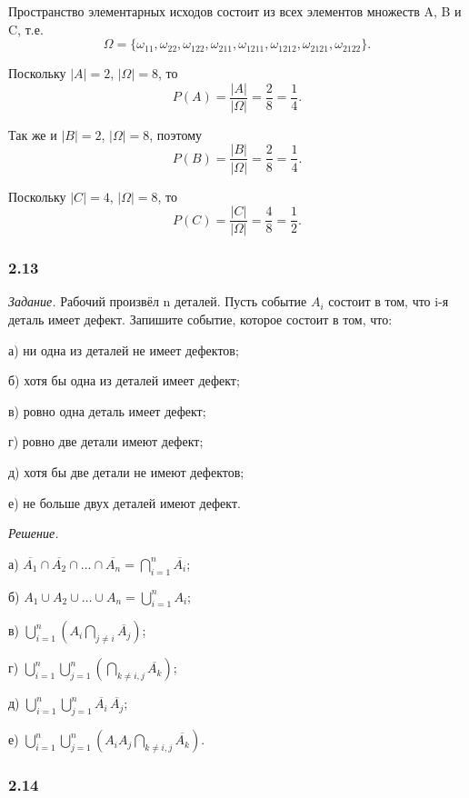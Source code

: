 \documentclass{book}
\begin{document}
Пространство элементарных исходов состоит из всех элементов множеств A, B и C, т.е.
$$ \Omega =
\{ \omega_{11}, \omega_{22}, \omega_{122}, \omega_{211}, \omega_{1211}, \omega_{1212}, \omega_{2121}, \omega_{2122} \}.$$

Поскольку $ |A| = 2 $, $ |\Omega| = 8 $, то
$$ P(A) =
\frac{ |A| }{ |\Omega| } =
\frac{2}{8} =
\frac{1}{4}.$$

Так же и $ |B| = 2 $, $ |\Omega| = 8 $, поэтому
$$ P(B) =
\frac{ |B| }{ |\Omega| } =
\frac{2}{8} =
\frac{1}{4}.$$

Поскольку $ |C| = 4 $, $ |\Omega| = 8 $, то
$$ P(C) =
\frac{ |C| }{ |\Omega| } =
\frac{4}{8} =
\frac{1}{2}.$$

\subsubsection*{2.13}

\textit{Задание.} Рабочий произвёл n деталей.
Пусть событие $ A_i $ состоит в том, что i-я деталь имеет дефект.
Запишите событие, которое состоит в том, что:

а) ни одна из деталей не имеет дефектов;

б) хотя бы одна из деталей имеет дефект;

в) ровно одна деталь имеет дефект;

г) ровно две детали имеют дефект;

д) хотя бы две детали не имеют дефектов;

е) не больше двух деталей имеют дефект.

\textit{Решение.}

а) $ \overline{ A_1 } \cap \overline{ A_2 } \cap \dotsc \cap \overline{ A_n } =
\bigcap \limits_{ i = 1 }^n \overline{ A_i }$;

б) $ A_1 \cup A_2 \cup \dotsc \cup A_n =
\bigcup \limits_{ i = 1 }^n A_i $;

в) $ \bigcup \limits_{ i = 1 }^n \left( A_i \bigcap \limits_{ j \neq i } \overline{ A_j } \right) $;

г) $ \bigcup \limits_{ i = 1 }^n \bigcup \limits_{ j = 1 }^n \left( \bigcap \limits_{ k \neq i, j} \overline{ A_k } \right) $;

д) $ \bigcup \limits_{ i = 1 }^n \bigcup \limits_{ j = 1 }^n \overline{ A_i } \, \overline{ A_j } $;

е) $ \bigcup \limits_{ i = 1 }^n \bigcup \limits_{ j = 1 }^n \left( A_i A_j \bigcap \limits_{ k \neq i, j } \overline{ A_k } \right) $.

\subsubsection*{2.14}
\end{document}

